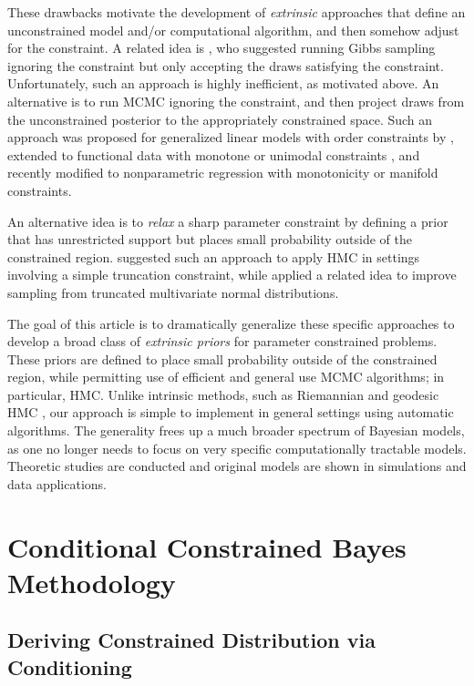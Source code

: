 \documentclass[10pt]{article}
\DeclareMathOperator{\1}{\mathbbm{1}}
\begin{document}
These drawbacks motivate the development of {\em extrinsic} approaches that
define an unconstrained model and/or computational algorithm, and then
somehow adjust for the constraint. A related idea is
\cite{gelfand1992bayesian}, who suggested running Gibbs sampling ignoring
the constraint but only accepting the draws satisfying the constraint.
Unfortunately, such an approach is highly inefficient, as motivated above.
An alternative is to run MCMC ignoring the constraint, and then project
draws from the unconstrained posterior to the appropriately constrained
space. Such an approach was proposed for generalized linear models with
order constraints by \cite{dunson2003bayesian}, extended to functional data
with monotone or unimodal constraints \citep{gunn2005transformation}, and
recently modified to nonparametric regression with monotonicity
\citep{lin2014monogp} or manifold \citep{lin2016extrinsic} constraints.

An alternative idea is to {\em relax} a sharp parameter constraint by
defining a prior that has unrestricted support but places small probability
outside of the constrained region. \cite{neal2011mcmc} suggested such an
approach to apply HMC in settings involving a simple truncation constraint,
while \cite{pakman2014exact} applied a related idea to improve sampling
from truncated multivariate normal distributions.

The goal of this article is to dramatically generalize these specific
approaches to develop a broad class of {\em extrinsic priors} for parameter
constrained problems. These priors are defined to place small probability
outside of the constrained region, while permitting use of efficient and
general use MCMC algorithms; in particular, HMC. Unlike intrinsic methods,
such as Riemannian and geodesic HMC
\citep{girolami2011riemann,byrne2013geodesic}, our approach is simple to
implement in general settings using automatic algorithms. The generality
frees up a much broader spectrum of Bayesian models, as one no longer needs
to focus on very specific computationally tractable models.  Theoretic
studies are conducted and original models are shown in simulations and data
applications.

\section{Conditional Constrained Bayes Methodology}

\subsection{Deriving Constrained Distribution via Conditioning}
\end{document}
